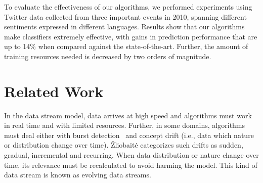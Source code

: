 \documentclass{sig-alternate}
\begin{document}

To evaluate the effectiveness of our algorithms, we
performed experiments using Twitter data collected from three important events in 2010, spanning different sentiments expressed in different languages.
Results show that our algorithms make classifiers extremely effective, with gains in prediction performance that are up to 14\% when compared against the state-of-the-art. Further, the amount of training resources needed is decreased by two orders of magnitude.
\section{Related Work}

In the data stream model, data arrives at high speed and algorithms must
work in real time and with limited resources. Further, in some domains,
algorithms must deal either with burst detection~\cite{shasha} and concept drift (i.e.,
data which nature or distribution change over time). \v{Z}liobait\.{e}
\cite{DBLP:journals/corr/abs-1010-4784} categorizes such drifts as sudden, gradual,
incremental and recurring. When data distribution or nature change over time, its relevance
must be recalculated to avoid harming the model. This kind of data stream is known as
evolving data streams.
\end{document}
